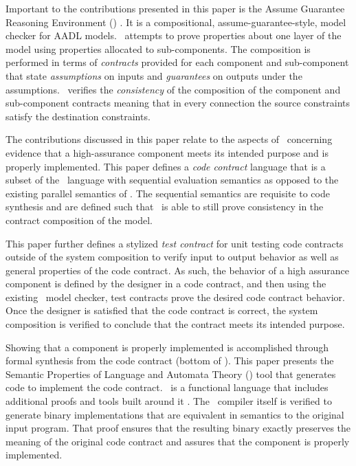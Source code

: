 Important to the contributions presented in this paper is the Assume Guarantee Reasoning Environment (\agr) \cite{compositional-analysis-agree,nfm:agree}. It is a compositional, assume-guarantee-style, model checker for AADL models. 
\agr\ attempts to prove properties about one layer of the model using properties allocated to sub-components.
The composition is performed in terms of \emph{contracts} provided for each component and sub-component that state \emph{assumptions} on inputs and \emph{guarantees} on outputs under the assumptions.
\agr\ verifies the \emph{consistency} of the composition of the component and sub-component contracts meaning that in every connection the source constraints satisfy the destination constraints.

The contributions discussed in this paper relate to the aspects of \brfcs\ concerning evidence that a high-assurance component meets its intended purpose and is properly implemented.
This paper defines a \emph{code contract} language that is a subset of the \agr\ language with sequential evaluation semantics as opposed to the existing parallel semantics of \agr.
The sequential semantics are requisite to code synthesis and are defined such that \agr\ is able to still prove consistency in the contract composition of the model. 

This paper further defines a stylized \emph{test contract} for unit testing code contracts outside of the system composition to verify input to output behavior as well as general properties of the code contract.
As such, the behavior of a high assurance component is defined by the designer in a code contract, and then using the existing \agr\ model checker, test contracts prove the desired code contract behavior.
Once the designer is satisfied that the code contract is correct, the system composition is verified to conclude that the contract meets its intended purpose.

Showing that a component is properly implemented is accomplished through formal synthesis from the code contract (bottom of ).
This paper presents the Semantic Properties of Language and Automata Theory (\splt) tool that generates \emph{\ckml} code to implement the code contract.
\ckml\ is a functional language that includes additional proofs and tools built around it \cite{cakeml}.
The \ckml\ compiler itself is verified to generate binary implementations that are equivalent in semantics to the original input program.
That proof ensures that the resulting binary exactly preserves the meaning of the original code contract and assures that the component is properly implemented.